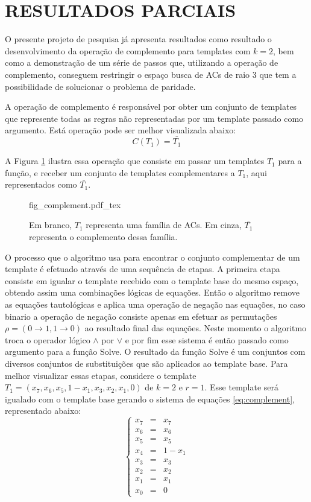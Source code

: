 \documentclass[12pt,a4paper]{article}
\let\stdsection\section
\renewcommand\section{\newpage\stdsection}
\begin{document}
\section{RESULTADOS PARCIAIS}\label{sec:aplicacao}

	O presente projeto de pesquisa já apresenta resultados como resultado o desenvolvimento da operação de complemento para templates com $k=2$, bem como a demonstração de um série de passos que, utilizando a operação de complemento, conseguem restringir o espaço busca de ACs de raio 3 que tem a possibilidade de solucionar o problema de paridade.

	A operação de complemento é responsável por obter um conjunto de templates que represente todas as regras não representadas por um template passado como argumento. Está operação pode ser melhor visualizada abaixo:
	\begin{equation}
	C(T_1)=\bar{T_1}
	\end{equation}

	A Figura \ref{fig:complement} ilustra essa operação que consiste em passar um templates $T_1$ para a função, e receber um conjunto de templates complementares a $T_1$, aqui representados como $\bar{T_1}$.
	\begin{figure}[h!]
	  \centering
	  \def\svgscale{0.5}
	  {fig_complement.pdf_tex}
	  \caption{Em branco, $T_1$ representa uma família de ACs. Em cinza, $\bar{T_1}$ representa o complemento dessa família.}
	  \label{fig:complement}
	\end{figure}

	O processo que o algoritmo usa para encontrar o conjunto complementar de um template é efetuado através de uma sequência de etapas. A primeira etapa consiste em igualar o template recebido com o template base do mesmo espaço, obtendo assim uma combinações lógicas de equações. Então o algoritmo remove as equações tautológicas e aplica uma operação de negação nas equações, no caso binario a operação de negação consiste apenas em efetuar as permutações $\rho = (0 \rightarrow 1, 1 \rightarrow 0)$ ao resultado final das equações. Neste momento o algoritmo troca o operador lógico $\wedge$ por $\vee$ e por fim esse sistema é então passado como argumento para a função Solve. O resultado da função Solve é um conjuntos com diversos conjuntos de substituições que são aplicados ao template base. Para melhor visualizar essas etapas, considere o template $T_1 = (x_7, x_6, x_5, 1 - x_1, x_3, x_2, x_1, 0)$ de $k=2$ e $r=1$. Esse template será igualado com o template base gerando o sistema de equações \ref{eq:complement}, representado abaixo:
	\begin{equation}
	\left\{\begin{matrix}
	x_7 & = & x_7	\\ 
	x_6 & = & x_6	\\ 
	x_5 & = & x_5	\\ 
	x_4 & = & 1 - x_1 \\ 
	x_3 & = & x_3	\\ 
	x_2 & = & x_2	\\ 
	x_1 & = & x_1	\\ 
	x_0 & = & 0
	\end{matrix}\right.
	\label{eq:complement}
	\end{equation}
\end{document}
